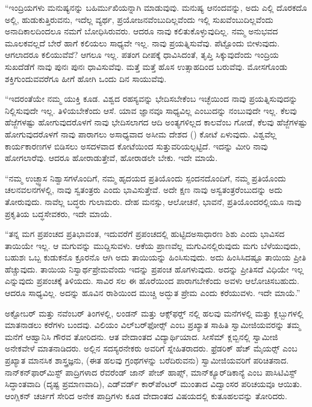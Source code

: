 \newpage

 “ಇಂದ್ರಿಯಗಳು ಮನುಷ್ಯನನ್ನು ಬಹಿರ್ಮುಖಿಯನ್ನಾಗಿ ಮಾಡುವುವು. ಮನುಷ್ಯ ಆನಂದವನ್ನು, ಅದು ಎಲ್ಲಿ ದೊರಕದೊ ಅಲ್ಲಿ, ಹುಡುಕುತ್ತಿರುವನು, ಇದೆಲ್ಲ ವ್ಯರ್ಥ, ಪ್ರಯೋಜನವೆಂಬುದಿಲ್ಲವೆಂದು ಇಲ್ಲಿ ಸುಖವೆಂಬುದಿಲ್ಲವೆಂದು ಅನಾದಿಕಾಲದಿಂದಲೂ ನಮಗೆ ಬೋಧಿಸಿರುವರು. ಆದರೂ ನಾವು ಕಲಿತುಕೊಳ್ಳುವುದಿಲ್ಲ. ನಮ್ಮ ಅನುಭವದ ಮೂಲಕವಲ್ಲದೆ ಬೇರೆ ಹಾಗೆ ಕಲಿಯಲು ಸಾಧ್ಯವೇ ಇಲ್ಲ. ನಾವು ಪ್ರಯತ್ನಿಸುವೆವು. ಪೆಟ್ಟೊಂದು ಬೀಳುವುದು. ಆಗಲಾದರೂ ಕಲಿಯುವೆವೆ? ಆಗಲೂ ಇಲ್ಲ. ಪತಂಗ ದೀಪಕ್ಕೆ ಧಾವಿಸಿದಂತೆ, ತೃಪ್ತಿ ಸಿಕ್ಕುವುದೆಂದು ಇಂದ್ರಿಯ ಸುಖದೆಡೆಗೆ ನಾವು ಪುನಃ ಪುನಃ ಧಾವಿಸುವೆವು. ಮತ್ತೆ ಮತ್ತೆ ಹೊಸ ಉತ್ಸಾಹದಿಂದ ಬರುವೆವು. ಮೋಸಗೊಂಡು ಶಕ್ತಿಗುಂದುವವರೆಗೂ ಹೀಗೆ ಹೋಗಿ ಒಂದು ದಿನ ಸಾಯುವೆವು.

 “ಇದರಂತೆಯೇ ನಮ್ಮ ಯುಕ್ತಿ ಕೂಡ. ವಿಶ್ವದ ರಹಸ್ಯವನ್ನು ಭೇದಿಸಬೇಕೆಂಬ ಇಚ್ಛೆಯಿಂದ ನಾವು ಪ್ರಯತ್ನಿಸುವುದನ್ನು ನಿಲ್ಲಿಸುವುದೇ ಇಲ್ಲ. ತಿಳಿಯಬೇಕೆಂದು ಆಸೆ. ಯಾವ ಜ್ಞಾನವೂ ಸಾಧ್ಯವಿಲ್ಲ ಎಂಬುದನ್ನು ನಂಬುವುದೇ ಇಲ್ಲ. ಕೆಲವು ಹೆಜ್ಜೆಗಳಷ್ಟು ಹೋಗುವುದರೊಳಗೆ ನಾವು ಭೇದಿಸಲಾಗದ ಆದಿ ಅಂತ್ಯಗಳಿಲ್ಲದ ಕಾಲವೆಂಬ ಗೋಡೆ, ಕೆಲವು ಹೆಜ್ಜೆಗಳಷ್ಟು ಹೋಗುವುದರೊಳಗೆ ನಾವು ಪಾರಾಗಲು ಅಸಾಧ್ಯವಾದ ಅಸೀಮ ದೇಶದ () ಕೋಟೆ ಏಳುವುದು. ವಿಶ್ವವೆಲ್ಲ ಕಾರ್ಯಕಾರಣಗಳ ಬಿಡಿಸಲು ಅಸದಳವಾದ ಕೋಟೆಯಿಂದ ಸುತ್ತುವರಿಯಲ್ಪಟ್ಟಿದೆ. ಇದನ್ನು ಮೀರಿ ನಾವು ಹೋಗಲಾರೆವು. ಆದರೂ ಹೋರಾಡುತ್ತೇವೆ, ಹೋರಾಡಲೇ ಬೇಕು. ಇದೇ ಮಾಯೆ.

 “ನಮ್ಮ ಉಚ್ಛ್ವಾಸ ನಿಶ್ವಾಸಗಳೊಂದಿಗೆ, ನಮ್ಮ ಹೃದಯದ ಪ್ರತಿಯೊಂದು ಸ್ಪಂದನದೊಂದಿಗೆ, ನಮ್ಮ ಪ್ರತಿಯೊಂದು ಚಲನವಲನಗಳಲ್ಲಿ, ನಾವು ಸ್ವತಂತ್ರರು ಎಂದು ಭಾವಿಸುತ್ತೇವೆ. ಅದೇ ಕ್ಷಣ ನಾವು ಅಸ್ವತಂತ್ರರೆಂಬುದನ್ನು ಅದು ತೋರುವುದು. ನಾವೆಲ್ಲ ಬದ್ಧರು ಗುಲಾಮರು. ದೇಹ ಮನಸ್ಸು, ಆಲೋಚನೆ, ಭಾವನೆ, ಪ್ರತಿಯೊಂದರಲ್ಲಿಯೂ ನಾವು ಪ್ರಕೃತಿಯ ಬದ್ಧಸೇವಕರು, ಇದೇ ಮಾಯೆ.

 “ತನ್ನ ಮಗ ಪ್ರಪಂಚದ ಪ್ರತಿಭಾವಂತ, ಇದುವರೆಗೆ ಪ್ರಪಂಚದಲ್ಲಿ ಹುಟ್ಟಿದ\break ಅಸಾಧಾರಣ ಶಿಶು ಎಂದು ಭಾವಿಸದ ತಾಯಿಯೇ ಇಲ್ಲ. ಆ ಮಗುವನ್ನು ಮುದ್ದಿಸುವಳು. ಆಕೆಯ ಪ್ರಾಣವೆಲ್ಲ ಮಗುವಿನಲ್ಲಿರುವುದು ಮಗು ಬೆಳೆಯುವುದು, ಬಹುಶಃ ಒಬ್ಬ ಕುಡುಕನೊ ಕ್ರೂರನೊ ಆಗಿ ಅದು ತಾಯಿಯನ್ನು ಹಿಂಸಿಸುವುದು. ಅದು ಹಿಂಸಿಸಿದಷ್ಟೂ ತಾಯಿಯ ಪ್ರೀತಿ ಹೆಚ್ಚುವುದು. ತಾಯಿಯ ನಿಸ್ವಾರ್ಥಪ್ರೇಮವೆಂದು ಇದನ್ನು ಪ್ರಪಂಚ ಹೊಗಳುವುದು. ಅದನ್ನು ಪ್ರೀತಿಸದೆ ವಿಧಿಯೇ ಇಲ್ಲ ಎನ್ನುವುದು ಪ್ರಪಂಚಕ್ಕೆ ತಿಳಿಯದು. ಸಾವಿರ ಸಲ ಈ ಹೊರೆಯಿಂದ ಪಾರಾಗಬೇಕೆಂದು ಅವಳು ಆಲೋಚಿಸಬಹುದು. ಆದರೂ ಸಾಧ್ಯವಿಲ್ಲ. ಅದನ್ನು ಹೂವಿನ ರಾಶಿಯಿಂದ ಮುಚ್ಚಿ ಅದ್ಭುತ ಪ್ರೇಮ ಎಂದು ಕರೆಯುವಳು. ಇದೇ ಮಾಯೆ.” 

\newpage

 ಅಕ್ಟೋಬರ್ ಮತ್ತು ನವೆಂಬರ್ ತಿಂಗಳಲ್ಲಿ, ಲಂಡನ್ ಮತ್ತು ಆಕ್ಸ್‌ಫರ್ಡ್‍ ನಲ್ಲಿ ಹಲವು ಮನೆಗಳಲ್ಲಿ ಮತ್ತು ಕ್ಲಬ್ಬುಗಳಲ್ಲಿ ಮಾತನಾಡಲು ಕರೆಗಳು ಬಂದವು. ವಿಲಿಯಂ ವಿಲ್‌ಬರ್‌ಫೋರ್ಸ್‍ ಎಂಬ ಪ್ರಖ್ಯಾತ ಸಾಹಿತಿ ಸ್ವಾಮೀಜಿಯವರನ್ನು ತಮ್ಮ ಮನೆಗೆ ಆಹ್ವಾನಿಸಿ ಗೌರವ ತೋರಿದನು. ಆತ ವೇದಾಂತದ ವಿದ್ಯಾರ್ಥಿಯಾದ. ಸೀಸೆಮ್ ಕ್ಲಬ್ಬಿನಲ್ಲಿ ಸ್ವಾಮೀಜಿ ಅನೇಕವೇಳೆ ಮಾತನಾಡಿದರು. ಅಲ್ಲಿನ ಸದಸ್ಯರನೇಕರು ಅವರಿಗೆ ಸ್ನೇಹಿತರಾದರು. ಫ್ರೆಡರಿಕ್ ಹೆಚ್ ಮೈಯರ್ಸ್‍ ಎಂಬ ಪ್ರಖ್ಯಾತ ಮಾನಸಿಕ ಶಾಸ್ತ್ರಜ್ಞನು, (ಈತ ಹಲವು ಗ್ರಂಥಗಳನ್ನು ಬರೆದಿರುವನು) ಸ್ವಾಮೀಜಿಯವರಿಗೆ ಪರಿಚಿತನಾದ. ನಾನ್‌ಕನ್‌ಫಾರ್‌ಮಿಸ್ಟ್ ಪಾದ್ರಿಗಳಾದ ರೆವರೆಂಡ್ ಜಾನ್ ಪೇಜ್ ಹಾಪ್ಸ್, ಮಾನ್‌ಕ್ಯೂರ್‌ಡಿಕಾನ್ಯೆ ಎಂಬ ಪಾಸಿಟಿವಿಸ್ಟ್ ಸಿದ್ಧಾಂತವಾದಿ (ದೃಷ್ಟ ಪ್ರಮಾಣವಾದಿ), ಎಡ್‌ವರ್ಡ್ ಕಾರ್‌ಪೆಂಟರ್ ಮುಂತಾದ ವಿದ್ವಾಂಸರ ಪರಿಚಯವೂ ಆಯಿತು. ಆಂಗ್ಲಿಕನ್ ಚರ್ಚಿಗೆ ಸೇರಿದ ಅನೇಕ ಪಾದ್ರಿಗಳು ಕೂಡ ವೇದಾಂತದ ವಿಷಯದಲ್ಲಿ ಕುತೂಹಲವನ್ನು ತೋರಿದರು. 

